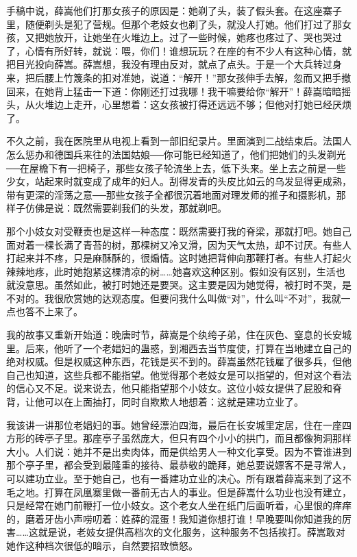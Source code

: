 手稿中说，薛嵩他们打那女孩子的原因是：她剃了头，装了假头套。在这座寨子里，随便剃头是犯了营规。但那个老妓女也剃了头，就没人打她。他们打过了那女孩，又把她放开，让她坐在火堆边上。过了一些时候，她疼也疼过了、哭也哭过了，心情有所好转，就说：喂，你们！谁想玩玩？在座的有不少人有这种心情，就把目光投向薛嵩。薛嵩想，我没有理由反对，就点了点头。于是一个大兵转过身来，把后腰上竹篾条的扣对准她，说道：“解开！”那女孩伸手去解，忽而又把手撤回来，在她背上猛击一下道：你刚还打过我哪！我干嘛要给你“解开”！薛嵩暗暗摇头，从火堆边上走开，心里想着：这女孩被打得还远远不够；但他对打她已经厌烦了。 

不久之前，我在医院里从电视上看到一部旧纪录片。里面演到二战结束后。法国人怎么惩办和德国兵来往的法国姑娘──你可能已经知道了，他们把她们的头发剃光──在屋檐下有一把椅子，那些女孩子轮流坐上去，低下头来。坐上去之前是一些少女，站起来时就变成了成年的妇人。刮得发青的头皮比如云的乌发显得更成熟，带有更深的淫荡之意──那些女孩子全都很沉着地面对理发师的推子和摄影机，那样子仿佛是说：既然需要剃我们的头发，那就剃吧。 

那个小妓女对受鞭责也是这样一种态度：既然需要打我的脊梁，那就打吧。她自己面对着一棵长满了青苔的树，那棵树又冷又滑，因为天气太热，却不讨厌。有些人打起来并不疼，只是麻酥酥的，很煽情。这时她把背伸向那鞭打者。有些人打起火辣辣地疼，此时她抱紧这棵清凉的树……她喜欢这种区别。假如没有区别，生活也就没意思。虽然如此，被打时她还是要哭。这主要是因为她觉得，被打时不哭，是不对的。我很欣赏她的达观态度。但要问我什么叫做“对”，什么叫“不对”，我就一点也答不上来了。 

我的故事又重新开始道：晚唐时节，薛嵩是个纨绔子弟，住在灰色、窒息的长安城里。后来，他听了一个老娼妇的蛊惑，到湘西去当节度使，打算在当地建立自己的绝对权威。但是权威这种东西，花钱是买不到的。薛嵩虽然花钱雇了很多兵，但他自己也知道，这些兵都不能指望。他觉得那个老妓女是可以指望的，但对这个看法的信心又不足。说来说去，他只能指望那个小妓女。这位小妓女提供了屁股和脊背，让他可以在上面抽打，同时自欺欺人地想着：这就是建功立业了。 

我该讲一讲那位老娼妇的事。她曾经漂泊四海，最后在长安城里定居，住在一座四方形的砖亭子里。那座亭子虽然庞大，但只有四个小小的拱门，而且都像狗洞那样大小。人们说：她并不是出卖肉体，而是供给男人一种文化享受。因为不管谁进到那个亭子里，都会受到最隆重的接待、最恭敬的跪拜，她总要说嫖客不是寻常人，可以建功立业。至于她自己，也有一番建功立业的决心。所有跟着薛嵩来到了这不毛之地。打算在凤凰寨里做一番前无古人的事业。但是薛嵩什么功业也没有建立，只是经常在她门前鞭打一位小妓女。这个老女人坐在纸门后面听着，心里恨的痒痒的，磨着牙齿小声唠叨着：姓薛的混蛋！我知道你想打谁！早晚要叫你知道我的厉害……这就是说，老妓女提供高档次的文化服务，这种服务不包括挨打。薛嵩敢对她作这种档次很低的暗示，自然要招致愤怒。 

